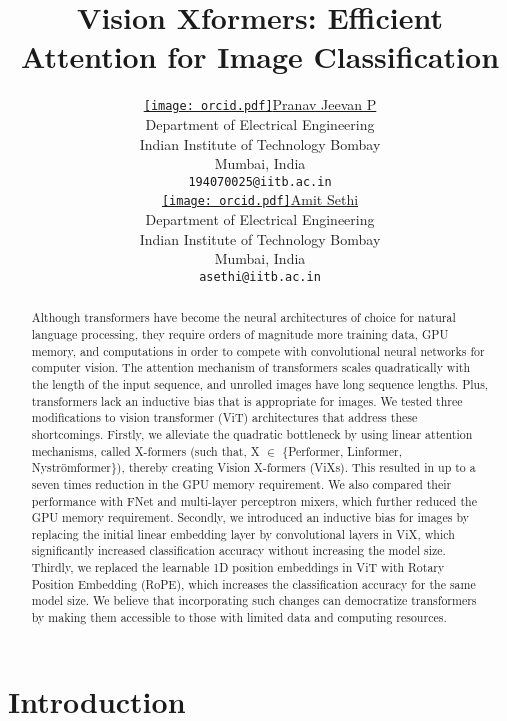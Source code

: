 \documentclass{article}
\title{Vision Xformers: Efficient Attention for Image Classification }
\author{ \href{https://orcid.org/0000-0003-4110-9638}{\texttt{[image: orcid.pdf]}\hspace{1mm}Pranav Jeevan P} \\
	Department of Electrical Engineering\\
	Indian Institute of Technology Bombay\\
	Mumbai, India  \\
	\texttt{194070025@iitb.ac.in} \\
\And
	\href{https://orcid.org/0000-0002-8003-6809}{\texttt{[image: orcid.pdf]}\hspace{1mm}Amit Sethi} \\
	Department of Electrical Engineering\\
	Indian Institute of Technology Bombay\\
	Mumbai, India \\
	\texttt{asethi@iitb.ac.in} \\
}
\date{}
\begin{document}
\maketitle

\begin{abstract}
Although transformers have become the neural architectures of choice for natural language processing, they require orders of magnitude more training data, GPU memory, and computations in order to compete with convolutional neural networks for computer vision. The attention mechanism of transformers scales quadratically with the length of the input sequence, and unrolled images have long sequence lengths. Plus, transformers lack an inductive bias that is appropriate for images. We tested three modifications to vision transformer (ViT) architectures that address these shortcomings. Firstly, we alleviate the quadratic bottleneck by using linear attention mechanisms, called X-formers (such that, X $\in$ \{Performer, Linformer, Nyströmformer\}), thereby creating Vision X-formers (ViXs). This resulted in up to a seven times reduction in the GPU memory requirement. We also compared their performance with FNet and multi-layer perceptron mixers, which further reduced the GPU memory requirement. Secondly, we introduced an inductive bias for images by replacing the initial linear embedding layer by convolutional layers in ViX, which significantly increased classification accuracy without increasing the model size. Thirdly, we replaced the learnable 1D position embeddings in ViT with Rotary Position Embedding (RoPE), which increases the classification accuracy for the same model size. We believe that incorporating such changes can democratize transformers by making them accessible to those with limited data and computing resources.

\end{abstract}


\section{Introduction}
\end{document}
